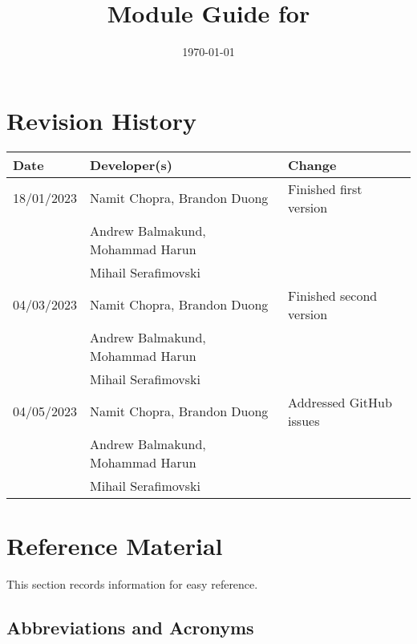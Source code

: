 \documentclass[12pt, titlepage]{article}
\begin{document}
\title{Module Guide for \progname{}} 
\author{\authname}
\date{\today}

\maketitle


\section{Revision History}

\begin{tabularx}{\textwidth}{llX}
\textbf{Date} & \textbf{Developer(s)} & \textbf{Change}\\
\midrule
18/01/2023 & Namit Chopra, Brandon Duong & Finished first version \\
 & Andrew Balmakund, Mohammad Harun \\
 & Mihail Serafimovski & \\
 04/03/2023 & Namit Chopra, Brandon Duong & Finished second version \\
 & Andrew Balmakund, Mohammad Harun \\
 & Mihail Serafimovski & \\
 04/05/2023 & Namit Chopra, Brandon Duong & Addressed GitHub issues \\
 & Andrew Balmakund, Mohammad Harun \\
 & Mihail Serafimovski & \\
\bottomrule
\end{tabularx}

\newpage

\section{Reference Material}

This section records information for easy reference.

\subsection{Abbreviations and Acronyms}
\end{document}
